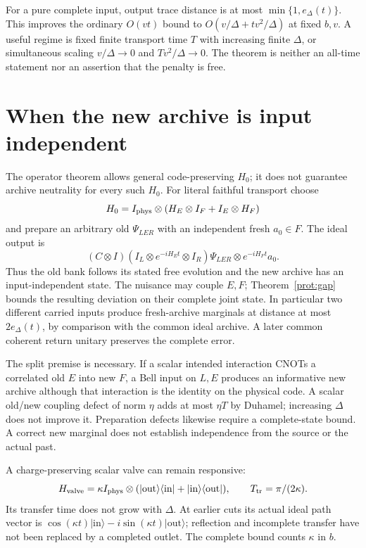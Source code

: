 \documentclass[11pt,oneside,openany]{book}
\theoremstyle{definition}
\theoremstyle{remark}\newtheorem{remark}[theorem]{Remark}
\begin{document}
For a pure complete input, output trace distance is at most $\min\{1,e_\Delta(t)\}$. This improves the ordinary $O(vt)$ bound to $O(v/\Delta+tv^2/\Delta)$ at fixed $b,v$. A useful regime is fixed finite transport time $T$ with increasing finite $\Delta$, or simultaneous scaling $v/\Delta\to0$ and $Tv^2/\Delta\to0$. The theorem is neither an all-time statement nor an assertion that the penalty is free.

\section{When the new archive is input independent}

The operator theorem allows general code-preserving $H_0$; it does not guarantee archive neutrality for every such $H_0$. For literal faithful transport choose
\begin{equation}
 H_0=I_{\rm phys}\otimes(H_E\otimes I_F+I_E\otimes H_F)
 \label{prot:split}
\end{equation}
and prepare an arbitrary old $\Psi_{LER}$ with an independent fresh $a_0\in F$. The ideal output is
\[
 (C\otimes I)(I_L\otimes e^{-iH_Et}\otimes I_R)\Psi_{LER}
                       \otimes e^{-iH_Ft}a_0.
\]
Thus the old bank follows its stated free evolution and the new archive has an input-independent state. The nuisance may couple $E,F$; Theorem~\ref{prot:gap} bounds the resulting deviation on their complete joint state. In particular two different carried inputs produce fresh-archive marginals at distance at most $2e_\Delta(t)$, by comparison with the common ideal archive. A later common coherent return unitary preserves the complete error.

The split premise is necessary. If a scalar intended interaction CNOTs a correlated old $E$ into new $F$, a Bell input on $L,E$ produces an informative new archive although that interaction is the identity on the physical code. A scalar old/new coupling defect of norm $\eta$ adds at most $\eta T$ by Duhamel; increasing $\Delta$ does not improve it. Preparation defects likewise require a complete-state bound. A correct new marginal does not establish independence from the source or the actual past.

A charge-preserving scalar valve can remain responsive:
\[
 H_{\rm valve}=\kappa I_{\rm phys}\otimes
 (|\mathrm{out}\rangle\langle\mathrm{in}|+
  |\mathrm{in}\rangle\langle\mathrm{out}|),
 \qquad T_{\rm tr}=\pi/(2\kappa).
\]
Its transfer time does not grow with $\Delta$. At earlier cuts its actual ideal path vector is
$\cos(\kappa t)|\mathrm{in}\rangle-i\sin(\kappa t)|\mathrm{out}\rangle$;
reflection and incomplete transfer have not been replaced by a completed outlet. The complete bound counts $\kappa$ in $b$.
\end{document}
